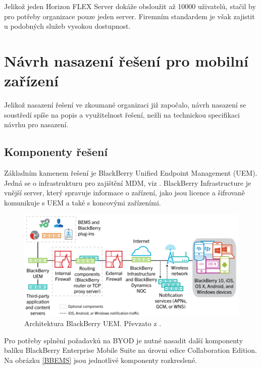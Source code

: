 Jelikož jeden Horizon FLEX Server dokáže obsloužit až 10000 uživatelů, stačil by pro potřeby organizace pouze jeden server. Firemním standardem je však zajistit u podobných služeb vysokou dostupnost.




\section{Návrh nasazení řešení pro mobilní zařízení}
Jelikož nasazení řešení ve zkoumané organizaci již započalo, návrh nasazení se soustředí spíše na popis a využitelnost řešení, nežli na technickou specifikaci návrhu pro nasazení.

\subsection{Komponenty řešení}


Základním kamenem řešení je BlackBerry Unified Endpoint Management (UEM). Jedná se o infrastrukturu pro zajištění MDM, viz \cite{BBUEM}. BlackBerry Infrastructure je vnější server, který spravuje informace o zařízení, jako jsou licence a šifrovaně komunikuje s UEM a také s koncovými zařízeními.

\begin{figure}[h!]\label{BBUEM1}
\centering
\includegraphics[width=12cm]{img/BBUEM1}
\caption{Architektura BlackBerry UEM. Převzato z \cite{BBUEM}.}
\end{figure}

Pro potřeby splnění požadavků na BYOD je nutné nasadit další komponenty balíku BlackBerry Enterprise Mobile Suite na úrovni edice Collaboration Edition. Na obrázku \ref{BBEMS} jsou jednotlivé komponenty rozkreslené.

